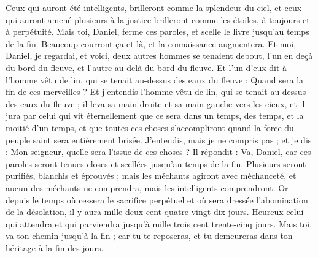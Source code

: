 \begin{multicols}{2}
Ceux qui auront été intelligents, brilleront comme la splendeur du ciel, et ceux qui auront amené plusieurs à la justice brilleront comme les étoiles, à toujours et à perpétuité.
Mais toi, Daniel, ferme ces paroles, et scelle le livre jusqu'au temps de la fin. Beaucoup courront ça et là, et la connaissance augmentera.
Et moi, Daniel, je regardai, et voici, deux autres hommes se tenaient debout, l'un en deçà du bord du fleuve, et l'autre au-delà du bord du fleuve.
Et l'un d'eux dit à l'homme vêtu de lin, qui se tenait au-dessus des eaux du fleuve : Quand sera la fin de ces merveilles ?
Et j'entendis l'homme vêtu de lin, qui se tenait au-dessus des eaux du fleuve ; il leva sa main droite et sa main gauche vers les cieux, et il jura par celui qui vit éternellement que ce sera dans un temps, des temps, et la moitié d'un temps, et que toutes ces choses s'accompliront quand la force du peuple saint sera entièrement brisée.
J'entendis, mais je ne compris pas ; et je dis : Mon seigneur, quelle sera l'issue de ces choses ?
Il répondit : Va, Daniel, car ces paroles seront tenues closes et scellées jusqu'au temps de la fin.
Plusieurs seront purifiés, blanchis et éprouvés ; mais les méchants agiront avec méchanceté, et aucun des méchants ne comprendra, mais les intelligents comprendront.
Or depuis le temps où cessera le sacrifice perpétuel et où sera dressée l'abomination de la désolation, il y aura mille deux cent quatre-vingt-dix jours.
Heureux celui qui attendra et qui parviendra jusqu'à mille trois cent trente-cinq jours.
Mais toi, va ton chemin jusqu'à la fin ; car tu te reposeras, et tu demeureras dans ton héritage à la fin des jours.
\PPE{}
\end{multicols}
